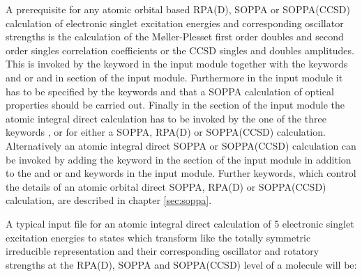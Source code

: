 A prerequisite for any atomic orbital based RPA(D), SOPPA or
SOPPA(CCSD) calculation of electronic singlet excitation energies and
corresponding oscillator strengths is the calculation of the
M{\o}ller-Plesset first order doubles and second order singles
correlation coefficients or the CCSD singles and doubles amplitudes.
This is invoked by the keyword  in the 
input module together with the keywords  and  or
 and  in  section of the
 input module. Furthermore in the
 input module it has to be specified by the keywords
 and  that a SOPPA calculation of optical
properties should be carried out. Finally in the  section of
the  input module the atomic integral direct
calculation has to be invoked by the one of the three keywords
,   or  for either a SOPPA, RPA(D) or
SOPPA(CCSD) calculation. Alternatively an atomic integral direct SOPPA
or SOPPA(CCSD) calculation can be invoked by adding the 
keyword in the  section of the  input
module in addition to the  and  or
 and  keywords in the 
input module. Further keywords, which control the details of an atomic
orbital direct SOPPA, RPA(D) or SOPPA(CCSD) calculation, are described
in chapter \ref{sec:soppa}.

A typical input file for an atomic integral direct calculation of 5
electronic singlet excitation energies to states which transform like
the totally symmetric irreducible representation and their
corresponding oscillator and rotatory strengths at the RPA(D), SOPPA and SOPPA(CCSD)
level of a molecule will be:

